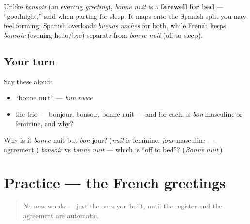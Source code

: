 \begin{culture}
Unlike \emph{bonsoir} (an evening \emph{greeting}), \emph{bonne nuit} is a \textbf{farewell for bed} — \textquotedblleft{}goodnight,\textquotedblright{} said when parting for sleep. It maps onto the Spanish split you may feel forming: Spanish overloads \emph{buenas noches} for both, while French keeps \emph{bonsoir} (evening hello/bye) separate from \emph{bonne nuit} (off-to-sleep).
\end{culture}

\subsection*{Your turn}
Say these aloud:

\begin{itemize}
\raggedright
  \item \textquotedblleft{}bonne nuit\textquotedblright{} — \emph{bun nwee}
  \item the trio — bonjour, bonsoir, bonne nuit — and for each, is \emph{bon} masculine or feminine, and why?
\end{itemize}

\begin{tcolorbox}[breakable,colback=teal!4,colframe=teal!35!black,title={Before you move on}]
Why is it \emph{bonne} nuit but \emph{bon} jour? (\emph{nuit} is feminine, \emph{jour} masculine — agreement.) \emph{bonsoir} vs \emph{bonne nuit} — which is \textquotedblleft{}off to bed\textquotedblright{}? (\emph{Bonne nuit}.)
\end{tcolorbox}
\section[Practice]{Practice — the French greetings}

\label{lesson:FR-C01-practice}



\begin{quote}
No new words — just the ones you built, until the register and the agreement are automatic.
\end{quote}

